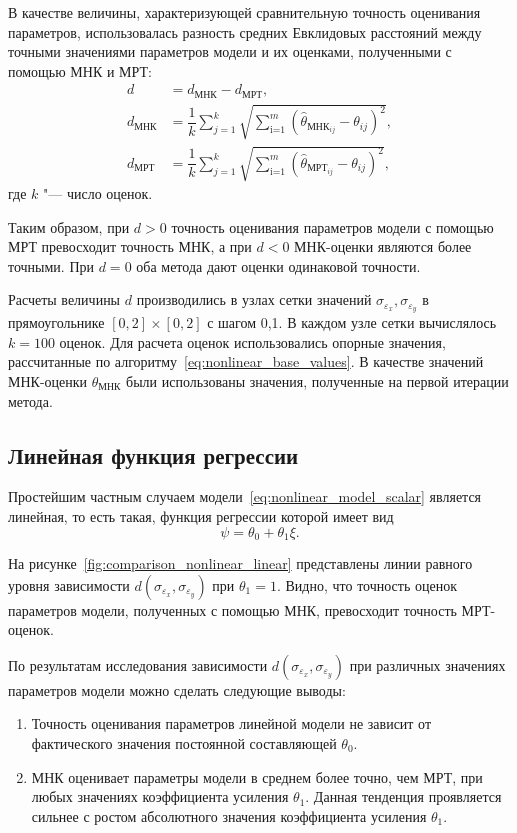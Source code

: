 В качестве величины, характеризующей сравнительную точность оценивания параметров,
использовалась разность средних Евклидовых расстояний
между точными значениями параметров модели и их оценками, полученными
с помощью МНК и МРТ:
\begin{equation*}
  \begin{aligned}
    d &= d_{\text{МНК}} - d_{\text{МРТ}}, \\
    d_{\text{МНК}} &=
    \dfrac{1}{k} \sum_{j=1}^k
    \sqrt{\sum_{\text{i=1}}^m (\hat{\theta}_{\text{МНК}_{ij}} - \theta_{ij})^2}, \\
    d_{\text{МРТ}} &=
    \dfrac{1}{k} \sum_{j=1}^k
    \sqrt{\sum_{\text{i=1}}^m (\hat{\theta}_{\text{МРТ}_{ij}} - \theta_{ij})^2},
  \end{aligned}
\end{equation*}
где \( k \) "--- число оценок.

Таким образом, при \( d > 0 \) точность оценивания параметров модели с помощью МРТ
превосходит точность МНК, а при \( d < 0 \) МНК-оценки являются более точными.
При \( d = 0 \) оба метода дают оценки одинаковой точности.

Расчеты величины \( d \) производились в узлах сетки значений
\( \sigma_{\varepsilon_x}, \sigma_{\varepsilon_y} \) в прямоугольнике
\( [0, 2] \times [0, 2] \) с шагом 0{,}1.
В каждом узле сетки вычислялось \( k = 100 \) оценок.
Для расчета оценок использовались опорные значения,
рассчитанные по алгоритму~\eqref{eq:nonlinear_base_values}.
В качестве значений МНК-оценки \( \theta_{\text{МНК}} \)
были использованы значения, полученные на первой итерации метода.

\pagebreak
\subsection{Линейная функция регрессии}

Простейшим частным случаем модели~\eqref{eq:nonlinear_model_scalar} является линейная,
то есть такая, функция регрессии которой имеет вид
\[ \psi = \theta_0 + \theta_1 \xi. \]

На рисунке~\ref{fig:comparison_nonlinear_linear}
представлены линии равного уровня зависимости \( d(\sigma_{\varepsilon_x}, \sigma_{\varepsilon_y}) \)
при \( \theta_1 = 1 \).
Видно, что точность оценок параметров модели, полученных с помощью МНК,
превосходит точность МРТ-оценок.

По результатам исследования зависимости \( d(\sigma_{\varepsilon_x}, \sigma_{\varepsilon_y}) \) при
различных значениях параметров модели можно сделать следующие выводы:
\begin{enumerate}
\item Точность оценивания параметров линейной модели не зависит
  от фактического значения постоянной составляющей \( \theta_0 \).
\item МНК оценивает параметры модели в среднем более точно, чем МРТ,
  при любых значениях коэффициента усиления \( \theta_1 \).
  Данная тенденция проявляется сильнее с ростом абсолютного значения
  коэффициента усиления \( \theta_1 \).
\end{enumerate}

